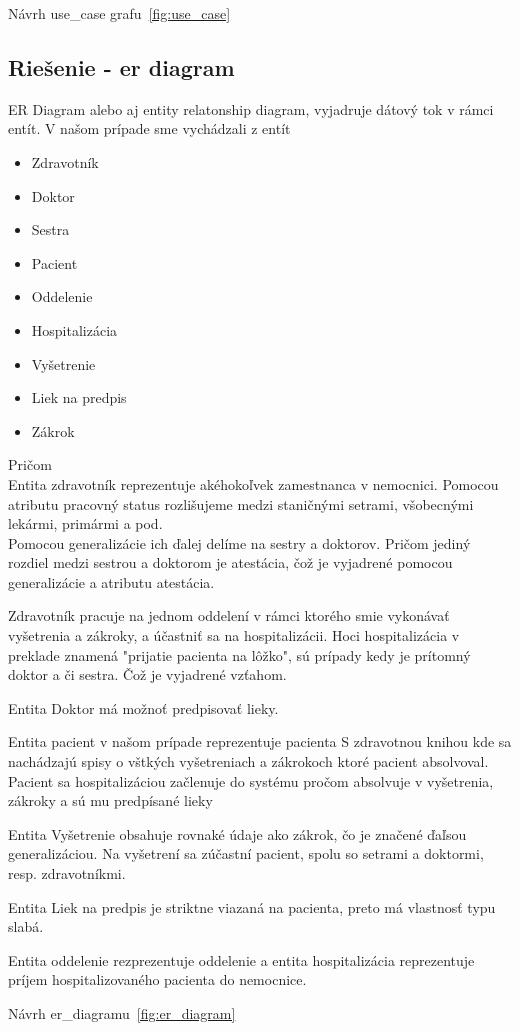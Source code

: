Návrh use\_case grafu~\ref{fig:use_case}

\subsection{Riešenie - er diagram}
ER Diagram alebo aj entity relatonship diagram, vyjadruje dátový tok v rámci entít.
V našom prípade sme vychádzali z entít

\begin{itemize}
    \item Zdravotník
    \item Doktor
    \item Sestra
    \item Pacient
    \item Oddelenie
    \item Hospitalizácia
    \item Vyšetrenie
    \item Liek na predpis
    \item Zákrok
\end{itemize}

\large{Pričom} \\
\indent Entita zdravotník reprezentuje akéhokoľvek zamestnanca v nemocnici. Pomocou atributu pracovný status rozlišujeme medzi staničnými setrami,
všobecnými lekármi, primármi a pod. \\
Pomocou generalizácie ich ďalej delíme na sestry a doktorov. Pričom jediný rozdiel medzi sestrou a doktorom je atestácia, čož
je vyjadrené pomocou generalizácie a atributu atestácia.

Zdravotník pracuje na jednom oddelení v rámci ktorého smie vykonávať vyšetrenia a zákroky, a účastniť sa na hospitalizácii.
Hoci hospitalizácia v preklade znamená "prijatie pacienta na lôžko", sú prípady kedy je prítomný doktor a či sestra. Čož
je vyjadrené vzťahom.

Entita Doktor má možnoť predpisovať lieky.

Entita pacient v našom prípade reprezentuje pacienta S zdravotnou knihou kde sa nachádzajú spisy o vštkých vyšetreniach a zákrokoch ktoré pacient
absolvoval.
Pacient sa hospitalizáciou začlenuje do systému pročom absolvuje v vyšetrenia, zákroky a sú mu predpísané lieky

Entita Vyšetrenie obsahuje rovnaké údaje ako zákrok, čo je značené ďaľsou generalizáciou.
Na vyšetrení sa zúčastní pacient, spolu so setrami a doktormi, resp. zdravotníkmi.

Entita Liek na predpis je striktne viazaná na pacienta, preto má vlastnosť  typu slabá.

Entita oddelenie rezprezentuje oddelenie a entita hospitalizácia reprezentuje príjem hospitalizovaného pacienta do nemocnice.


Návrh er\_diagramu~\ref{fig:er_diagram}
\newpage


